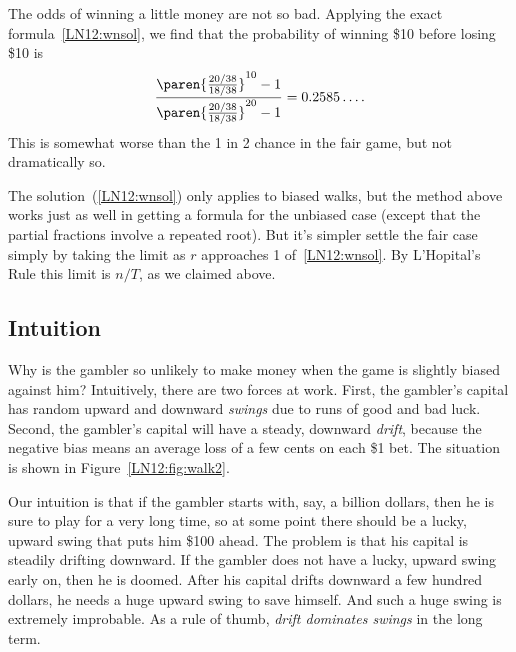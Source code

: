 \begin{example}
The odds of winning a little money are not so bad.
Applying the exact formula~\eqref{LN12:wnsol}, we find that the probability
of winning \$10 before losing \$10 is
\[
\frac{\paren{\frac{20/38}{18/38}}^{10} - 1}
              {\paren{\frac{20/38}{18/38}}^{20} - 1}
  = 0.2585\dots.
\]
This is somewhat worse than the 1 in 2 chance in the fair game, but not
dramatically so.
\fi

The solution~(\ref{LN12:wnsol}) only applies to biased walks, but the method
above works just as well in getting a formula for the unbiased case
(except that the partial fractions involve a repeated root).  But it's
simpler settle the fair case simply by taking the limit as $r$
approaches 1 of~\eqref{LN12:wnsol}.  By L'Hopital's Rule this limit is $n/T$,
as we claimed above.

\subsection{Intuition}

Why is the gambler so unlikely to make money when the game is slightly
biased against him?  Intuitively, there are two forces at work.  First,
the gambler's capital has random upward and downward {\em swings} due to
runs of good and bad luck.  Second, the gambler's capital will have a
steady, downward {\em drift}, because the negative bias means an average
loss of a few cents on each \$1 bet.  The situation is shown in
Figure~\ref{LN12:fig:walk2}.

Our intuition is that if the gambler starts with, say, a billion dollars,
then he is sure to play for a very long time, so at some point there
should be a lucky, upward swing that puts him \$100 ahead.  The problem is
that his capital is steadily drifting downward.  If the gambler does not
have a lucky, upward swing early on, then he is doomed.  After his capital
drifts downward a few hundred dollars, he needs a huge upward swing to
save himself.  And such a huge swing is extremely improbable.  As a rule
of thumb, \emph{drift dominates swings} in the long term.


\end{example}
